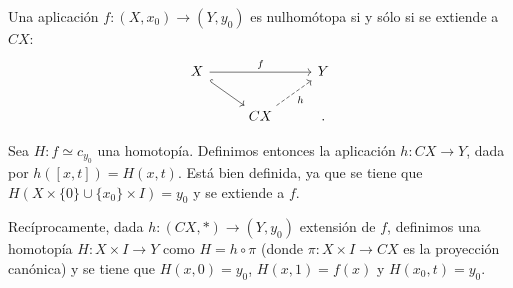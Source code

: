 \begin{teor}
Una aplicación $f : (X, x_0) \longrightarrow (Y, y_0)$ es nulhomótopa si y sólo si se extiende a $CX$: 
$$
\begin{tikzcd}
	X \arrow{rr}{f} \drar[hook] & & Y \\
	& CX \urar[dashed, swap]{h} &  .
\end{tikzcd}
$$
\end{teor}
\begin{demo}
Sea $H : f \simeq c_{y_0}$ una homotopía. Definimos entonces la aplicación $h : CX \longrightarrow Y$, dada por $h([x, t]) = H(x, t)$. Está bien definida, ya que se tiene que  $H(X \times \{ 0 \} \cup \{ x_0 \} \times I) = y_0$ y se extiende a $f$.\par 
Recíprocamente, dada $h : (CX, \ast) \longrightarrow (Y, y_0)$ extensión de $f$, definimos una homotopía $H: X \times I \longrightarrow Y$ como $H = h \circ \pi$ (donde $\pi: X \times I \longrightarrow CX$ es la proyección canónica) y se tiene que 
$H(x, 0) = y_0$, $H(x, 1) = f(x)$ y $H(x_0, t) = y_0$.
\end{demo}

